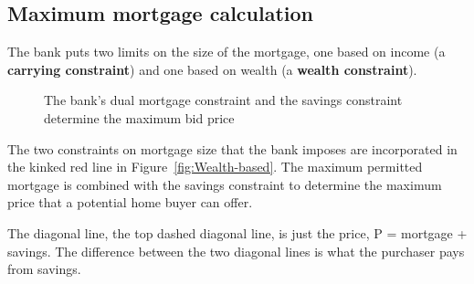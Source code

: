 {\subsection{Maximum mortgage calculation}
The bank puts two  limits on the size of the mortgage, one based on income (a \textbf{carrying constraint}) and one based on wealth (a \textbf{wealth constraint}).



\begin{figure}
\centering
{}
\caption{The bank's dual mortgage constraint and the savings constraint determine the maximum bid price}
\label{fig:my_label2}
\end{figure}


The two constraints on  mortgage size that the bank imposes are incorporated in the kinked red line in Figure~\ref{fig:Wealth-based}. The maximum  permitted mortgage is combined with the savings constraint to determine the maximum price that a potential home buyer can offer.   

The diagonal line, the top dashed diagonal line, is just the price, P = mortgage + savings.
The difference between the two diagonal lines is what the purchaser pays from savings.  

}
